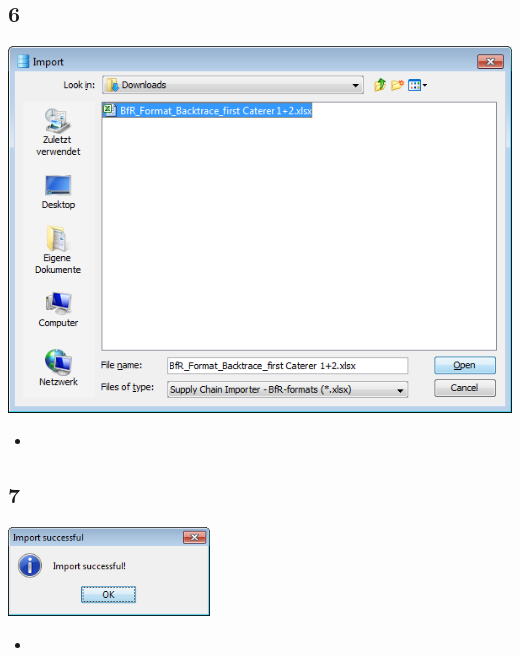 \documentclass{beamer}
\begin{document}
\subsection{6}
\begin{frame}
	\begin{center}
  		\includegraphics[height=0.5\textheight]{6.png}
	\end{center}
	\begin{itemize}
		\item
	\end{itemize}
\end{frame}

\subsection{7}
\begin{frame}
	\begin{center}
  		\includegraphics[width=0.4\textwidth]{7.png}
	\end{center}
	\begin{itemize}
		\item
	\end{itemize}
\end{frame}
\end{document}
